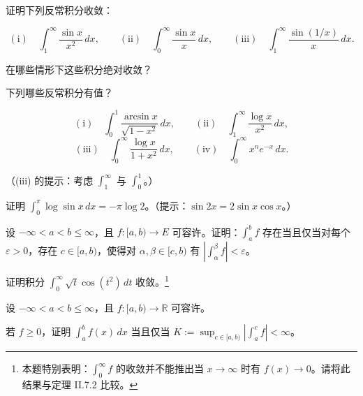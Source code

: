 \begin{exercises}
\item

证明下列反常积分收敛：

\[
\mathrm{(i)}\quad \int_{1}^{\infty} \frac{\sin x}{x^2} \, dx , \qquad \mathrm{(ii)}\quad \int_{0}^{\infty} \frac{\sin x}{x} \, dx , \qquad \mathrm{(iii)}\quad \int_{1}^{\infty} \frac{\sin(1/x)}{x} \, dx .
\]

在哪些情形下这些积分绝对收敛？

\item

下列哪些反常积分有值？

\[
\mathrm{(i)}\quad \int_{0}^{1} \frac{\arcsin x}{\sqrt{1 - x^2}} \, dx , \qquad \mathrm{(ii)}\quad \int_{1}^{\infty} \frac{\log x}{x^2} \, dx ,
\]
\[
\mathrm{(iii)}\quad \int_{0}^{\infty} \frac{\log x}{1 + x^2} \, dx , \qquad \mathrm{(iv)}\quad \int_{0}^{\infty} x^n e^{-x} \, dx .
\]

（(iii) 的提示：考虑 $ \int_{1}^{\infty} $ 与 $ \int_{0}^{1} $。）

\item

证明 $ \int_{0}^{\pi} \log \sin x \, dx = -\pi \log 2 $。（提示：$ \sin 2x = 2 \sin x \cos x $。）

\item

设 $ -\infty < a < b \le \infty $，且 $ f : [a, b) \to E $ 可容许。证明：$ \int_{a}^{b} f $ 存在当且仅当对每个 $ \varepsilon > 0 $，存在 $ c \in [a, b) $，使得对 $ \alpha, \beta \in [c, b) $ 有 $ \left| \int_{\alpha}^{\beta} f \right| < \varepsilon $。

\item

证明积分 $ \int_{0}^{\infty} \sqrt{t} \cos(t^2) \, dt $ 收敛。\footnote{本题特别表明：$ \int_{0}^{\infty} f $ 的收敛并不能推出当 $ x \to \infty $ 时有 $ f(x) \to 0 $。请将此结果与定理 II.7.2 比较。}

\item

设 $ -\infty < a < b \le \infty $，且 $ f : [a, b) \to \mathbb{R} $ 可容许。

\begin{subitems}
\item

若 $ f \ge 0 $，证明 $ \int_{a}^{b} f(x) \, dx $ 当且仅当 $ K := \sup_{c \in [a, b)} \left| \int_{a}^{c} f \right| < \infty $。

\item


\end{subitems}
\end{exercises}

